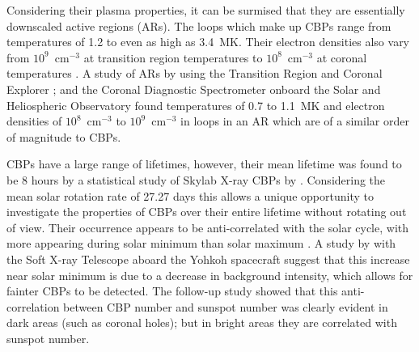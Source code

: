 Considering their plasma properties, it can be surmised that they are essentially downscaled active regions (ARs). The loops which make up CBPs range from temperatures of 1.2 to even as high as 3.4~MK. Their electron densities also vary from $10^9$~cm$^{-3}$ at transition region temperatures to $10^8$~cm$^{-3}$ at coronal temperatures \citep{madjarska_coronal_2019}. A study of ARs by \cite{del_zanna_solar_2003} using the Transition Region and Coronal Explorer \citep[TRACE;][]{handy_transition_1999}; and the Coronal Diagnostic Spectrometer \cite[CDS;][]{harrison_coronal_1995} onboard the Solar and Heliospheric Observatory \citep[SOHO;][]{domingo_soho_1995} found temperatures of 0.7 to 1.1~MK and electron densities of $10^8$~cm$^{-3}$ to $10^9$~cm$^{-3}$ in loops in an AR which are of a similar order of magnitude to CBPs. 

CBPs have a large range of lifetimes, however, their mean lifetime was found to be 8 hours by a statistical study of Skylab X-ray CBPs by \cite{golub_solar_1974}. Considering the mean solar rotation rate of 27.27 days \citep{stenflo_time_1990} this allows a unique opportunity to investigate the properties of CBPs over their entire lifetime without rotating out of view. Their occurrence appears to be anti-correlated with the solar cycle, with more appearing during solar minimum than solar maximum \citep{davis_solar_1977}. A study by \cite{nakakubo_variation_2000} with the Soft X-ray Telescope \citep[SXT;][]{tsuneta_soft_1991} aboard the Yohkoh \citep{ogawara_solar-mission_1991} spacecraft suggest that this increase near solar minimum is due to a decrease in background intensity, which allows for fainter CBPs to be detected. The follow-up study \citep{hara_variation_2003} showed that this anti-correlation between CBP number and sunspot number was clearly evident in dark areas (such as coronal holes); but in bright areas they are correlated with sunspot number.


